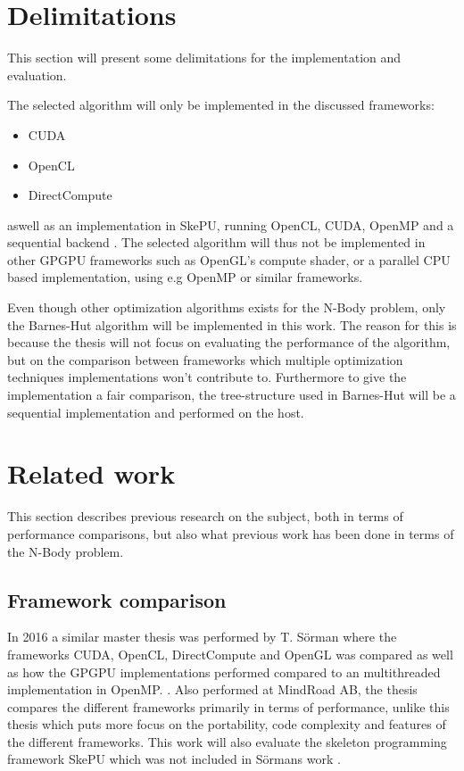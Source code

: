 \section{Delimitations}
This section will present some delimitations for the implementation and evaluation.

The selected algorithm will only be implemented in the discussed frameworks:
\begin{itemize}
    \item CUDA
    \item OpenCL
    \item DirectCompute
\end{itemize}

\noindent aswell as an implementation in SkePU, running OpenCL, CUDA, OpenMP and a sequential backend \cite{enmyren2010skepu}. The selected algorithm will thus not be implemented in other GPGPU frameworks such as OpenGL's compute shader, or a parallel CPU based implementation, using e.g OpenMP or similar frameworks.

Even though other optimization algorithms exists for the N-Body problem, only the Barnes-Hut algorithm will be implemented in this work. The reason for this is because the thesis will not focus on evaluating the performance of the algorithm, but on the comparison between frameworks which multiple optimization techniques implementations won't contribute to. Furthermore to give the implementation a fair comparison, the tree-structure used in Barnes-Hut will be a sequential implementation and performed on the host.

\section{Related work}
This section describes previous research on the subject, both in terms of performance comparisons, but also what previous work has been done in terms of the N-Body problem.


\subsection{Framework comparison}
In 2016 a similar master thesis was performed by T. Sörman where the frameworks CUDA, OpenCL, DirectCompute and OpenGL was compared as well as how the GPGPU implementations performed compared to an multithreaded implementation in OpenMP. \cite{Torbjorn}. Also performed at MindRoad AB, the thesis compares the different frameworks primarily in terms of performance, unlike this thesis which puts more focus on the portability, code complexity and features of the different frameworks. This work will also evaluate the skeleton programming framework SkePU which was not included in Sörmans work \cite{enmyren2010skepu}. 

